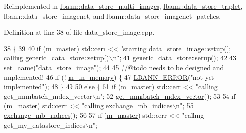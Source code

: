 Reimplemented in \hyperlink{classlbann_1_1data__store__multi__images_a7b5e9ec7b7132872299a204d5d24ee62}{lbann\+::data\+\_\+store\+\_\+multi\+\_\+images}, \hyperlink{classlbann_1_1data__store__triplet_aca66b9cf71d7ba2b9870e76c5b92b5e8}{lbann\+::data\+\_\+store\+\_\+triplet}, \hyperlink{classlbann_1_1data__store__imagenet_a611aa1734a491c443396a077b49fe4fe}{lbann\+::data\+\_\+store\+\_\+imagenet}, and \hyperlink{classlbann_1_1data__store__imagenet__patches_aa8cfaf12c87f3dbbbb4fc808f6ca26ad}{lbann\+::data\+\_\+store\+\_\+imagenet\+\_\+patches}.



Definition at line 38 of file data\+\_\+store\+\_\+image.\+cpp.


\begin{DoxyCode}
38                              \{
39 
40   \textcolor{keywordflow}{if} (\hyperlink{classlbann_1_1generic__data__store_a143fd33ef3a53180bc62745e369c16f8}{m\_master}) std::cerr << \textcolor{stringliteral}{"starting data\_store\_image::setup(); calling
       generic\_data\_store::setup()\(\backslash\)n"};
41   \hyperlink{classlbann_1_1generic__data__store_a1cff17def02ee21b6ca0befeb04bb582}{generic\_data\_store::setup}();
42 
43   \hyperlink{classlbann_1_1generic__data__store_a853741295a07b5687921fc56d0d7d5b2}{set\_name}(\textcolor{stringliteral}{"data\_store\_image"});
44 
45   \textcolor{comment}{//@todo needs to be designed and implemented!}
46   \textcolor{keywordflow}{if} (! \hyperlink{classlbann_1_1generic__data__store_a1a9cc7b097cd7dd6ae0d12d52bb43ea1}{m\_in\_memory}) \{
47     \hyperlink{base_8hpp_a80b1d707117e968a6951b7222e4b2b87}{LBANN\_ERROR}(\textcolor{stringliteral}{"not yet implemented"});
48   \} 
49   
50   \textcolor{keywordflow}{else} \{
51     \textcolor{keywordflow}{if} (\hyperlink{classlbann_1_1generic__data__store_a143fd33ef3a53180bc62745e369c16f8}{m\_master}) std::cerr << \textcolor{stringliteral}{"calling get\_minibatch\_index\_vector\(\backslash\)n"};
52     \hyperlink{classlbann_1_1generic__data__store_ab861db5f81e45a6063b8922a331dd007}{get\_minibatch\_index\_vector}();
53 
54     \textcolor{keywordflow}{if} (\hyperlink{classlbann_1_1generic__data__store_a143fd33ef3a53180bc62745e369c16f8}{m\_master}) std::cerr << \textcolor{stringliteral}{"calling exchange\_mb\_indices\(\backslash\)n"};
55     \hyperlink{classlbann_1_1generic__data__store_aa0ef8d7528f6775d47641ffe5ac229da}{exchange\_mb\_indices}();
56 
57     \textcolor{keywordflow}{if} (\hyperlink{classlbann_1_1generic__data__store_a143fd33ef3a53180bc62745e369c16f8}{m\_master}) std::cerr << \textcolor{stringliteral}{"calling get\_my\_datastore\_indices\(\backslash\)n"};

\end{DoxyCode}
